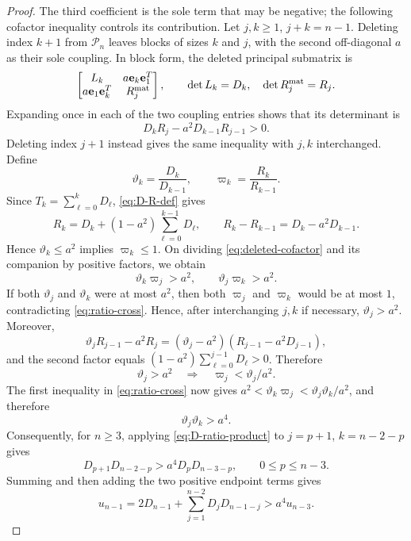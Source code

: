 \documentclass[a4paper,preprint,12pt,nopreprintline,sort&compress]{elsarticle}
\numberwithin{equation}{section}
\theoremstyle{remark}
\begin{document}
\begin{proof}
The third coefficient is the sole term that may be negative; the following
cofactor inequality controls its contribution.  Let \(j,k\geq1\),
\(j+k=n-1\).  Deleting index \(k+1\) from \(\mathcal P_n\) leaves blocks of
sizes \(k\) and \(j\), with the second off-diagonal \(a\) as their sole
coupling.  In block form, the deleted principal submatrix is
\[
 \begin{bmatrix}
  L_k&a \mathbf e_k\mathbf e_1^T\\
  a \mathbf e_1\mathbf e_k^T&R_j^{\rm mat}
 \end{bmatrix},
 \qquad \det L_k=D_k,\quad \det R_j^{\rm mat}=R_j.
\]
Expanding once in each of the two coupling entries shows that its
determinant is
\begin{equation}\label{eq:deleted-cofactor}
 D_kR_j-a^2D_{k-1}R_{j-1}>0.
\end{equation}
Deleting index \(j+1\) instead gives the same inequality with \(j,k\)
interchanged.  Define
\[
 \vartheta_k=\frac{D_k}{D_{k-1}},\qquad
 \varpi_k=\frac{R_k}{R_{k-1}}.
\]
Since \(T_k=\sum_{\ell=0}^kD_\ell\), \eqref{eq:D-R-def} gives
\begin{equation}\label{eq:R-D-relation}
 R_k=D_k+(1-a^2)\sum_{\ell=0}^{k-1}D_\ell,\qquad
 R_k-R_{k-1}=D_k-a^2D_{k-1}.
\end{equation}
Hence \(\vartheta_k\leq a^2\) implies \(\varpi_k\leq1\).  On dividing
\eqref{eq:deleted-cofactor} and its companion by positive factors, we
obtain
\begin{equation}\label{eq:ratio-cross}
 \vartheta_k\varpi_j>a^2,\qquad \vartheta_j\varpi_k>a^2.
\end{equation}
If both \(\vartheta_j\) and \(\vartheta_k\) were at most \(a^2\), then
both \(\varpi_j\) and \(\varpi_k\) would be at most \(1\),
contradicting \eqref{eq:ratio-cross}.  Hence, after interchanging
\(j,k\) if necessary, \(\vartheta_j>a^2\).  Moreover,
\[
 \vartheta_jR_{j-1}-a^2R_j
 =(\vartheta_j-a^2)(R_{j-1}-a^2D_{j-1}),
\]
and the second factor equals
\((1-a^2)\sum_{\ell=0}^{j-1}D_\ell>0\).  Therefore
\[
 \vartheta_j>a^2\quad\Longrightarrow\quad
 \varpi_j<\vartheta_j/a^2.
\]
The first inequality in \eqref{eq:ratio-cross} now gives
\(a^2<\vartheta_k\varpi_j<\vartheta_j\vartheta_k/a^2\), and therefore
\begin{equation}\label{eq:D-ratio-product}
 \vartheta_j\vartheta_k>a^4.
\end{equation}
Consequently, for \(n\geq3\),
applying \eqref{eq:D-ratio-product} to \(j=p+1\), \(k=n-2-p\) gives
\[
 D_{p+1}D_{n-2-p}>a^4D_pD_{n-3-p},
 \qquad0\leq p\leq n-3.
\]
Summing and then adding the two positive endpoint terms gives
\begin{equation}\label{eq:u-absorption}
 u_{n-1}=2D_{n-1}+\sum_{j=1}^{n-2}D_jD_{n-1-j}>a^4u_{n-3}.
\end{equation}


\end{proof}
\end{document}
